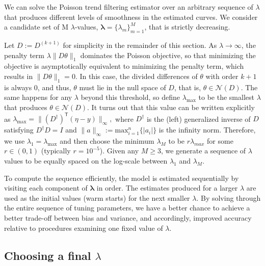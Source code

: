 \documentclass[10pt,letterpaper]{article}
\newcommand{\lr}[1]{\left(#1\right)}
\newcommand{\snorm}[1]{\lVert #1 \rVert}
\renewcommand{\top}{\mathsf{T}}
\begin{document}
We can solve the Poisson trend filtering estimator over an arbitrary sequence of 
$\lambda$ that produces different levels of smoothness in the estimated curves. 
We consider a candidate set of M $\lambda$-values, $\boldsymbol{\lambda} = \{\lambda_m\}_{m=1}^M$,
that is strictly decreasing.


Let $D := D^{(k+1)}$ for simplicity in the remainder of this section. As
$\lambda \to\infty$, the penalty term $\lambda \snorm{D\theta}_1$ dominates the
Poisson objective, so that minimizing the objective is asymptotically equivalent
to minimizing the penalty term, which results in $\snorm{D\theta}_1 = 0$. In
this case, the divided differences of $\theta$ with order $k+1$ is always $0$,
and thus, $\theta$ must lie in the null space of $D$, that is,
$\theta\in\mathcal{N}(D)$. The same happens for any $\lambda$ beyond this
threshold, so define $\lambda_{\textrm{max}}$ to be the smallest $\lambda$ that
produces $\theta\in\mathcal{N}(D)$. It turns out that this value can be written
explicitly as $\lambda_{\textrm{max}} = \snorm{\lr{D^{\dagger}}^{\top} \lr{\eta
- y}}_{\infty},$ where $D^{\dagger}$ is the (left) generalized inverse of $D$
satisfying $D^{\dagger} D = I$ and $\snorm{a}_{\infty} := \mathrm{max}_{i=1}^n\{|a_i|\}$ is the infinity norm. 
Therefore, we use $\lambda_1 =
\lambda_{\textrm{max}}$ and then choose the minimum $\lambda_M$ to be
$r\lambda_{max}$ for some $r \in (0,1)$ (typically $r=10^{-5}$). Given any
$M\geq 3$, we generate a sequence of $\lambda$ values to be equally spaced on
the log-scale between $\lambda_1$ and $\lambda_M$. 

To compute the sequence efficiently, the model is estimated sequentially by
visiting each component of $\boldsymbol{\lambda}$ in order. The estimates
produced for a larger $\lambda$ are used as the initial values (warm starts) for
the next smaller $\lambda$. By solving through the entire sequence of tuning
parameters, we have a better chance to achieve a better trade-off between bias
and variance, and accordingly, improved accuracy relative to procedures
examining one fixed value of $\lambda$.


\subsection{Choosing a final $\lambda$}
\label{sec:cv}
\end{document}
